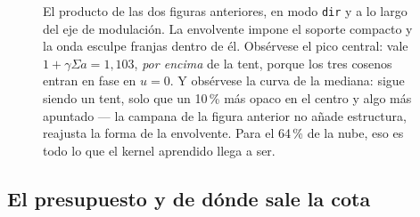 \documentclass[12pt]{extarticle}
\newcommand{\figcap}[1]{\caption{\small #1}}
\newcommand{\ssum}{\Sigma a}
\newcommand{\code}[1]{\texttt{#1}}
\begin{document}
\begin{figure}[H]\centering
{}
\figcap{El producto de las dos figuras anteriores, en modo \code{dir} y a lo
largo del eje de modulación. La envolvente impone el soporte compacto y la
onda esculpe franjas dentro de él. Obsérvese el pico central: vale
$1+\gamma\ssum=1{,}103$, \emph{por encima} de la tent, porque los tres cosenos
entran en fase en $u=0$. Y obsérvese la curva de la mediana: sigue siendo un
tent, solo que un 10\,\% más opaco en el centro y algo más apuntado --- la
campana de la figura anterior no añade estructura, reajusta la forma de la
envolvente. Para el 64\,\% de la nube, eso es todo lo que el kernel aprendido
llega a ser.}
\end{figure}

\subsection{El presupuesto y de dónde sale la cota}
\end{document}
